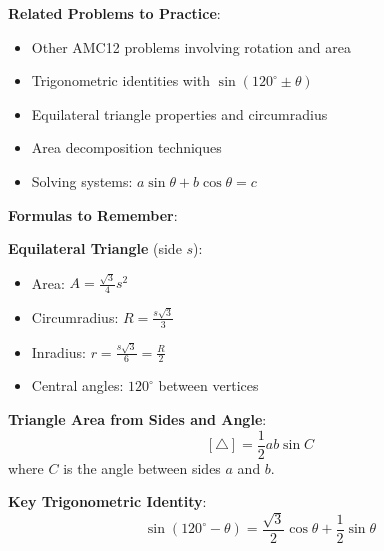 \documentclass[12pt]{article}
\begin{document}
\textbf{Related Problems to Practice}:
\begin{itemize}
    \item Other AMC12 problems involving rotation and area
    \item Trigonometric identities with $\sin(120^{\circ} \pm \theta)$
    \item Equilateral triangle properties and circumradius
    \item Area decomposition techniques
    \item Solving systems: $a\sin\theta + b\cos\theta = c$
\end{itemize}

\vspace{0.5cm}

\textbf{Formulas to Remember}:

\textbf{Equilateral Triangle} (side $s$):
\begin{itemize}
    \item Area: $A = \frac{\sqrt{3}}{4}s^2$
    \item Circumradius: $R = \frac{s\sqrt{3}}{3}$
    \item Inradius: $r = \frac{s\sqrt{3}}{6} = \frac{R}{2}$
    \item Central angles: $120^{\circ}$ between vertices
\end{itemize}

\textbf{Triangle Area from Sides and Angle}:
$$[\triangle] = \frac{1}{2}ab\sin C$$
where $C$ is the angle between sides $a$ and $b$.

\textbf{Key Trigonometric Identity}:
$$\sin(120^{\circ} - \theta) = \frac{\sqrt{3}}{2}\cos\theta + \frac{1}{2}\sin\theta$$
\end{document}
